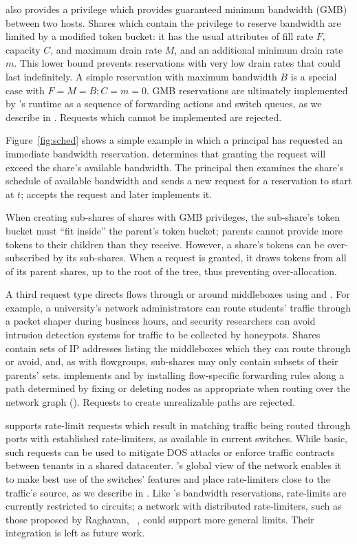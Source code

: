 \sys also provides a  privilege which provides
guaranteed minimum bandwidth (GMB) between two hosts.
Shares which contain the privilege to reserve bandwidth are limited
by a modified token bucket:
it has the usual attributes of fill rate $F$, capacity $C$, and maximum
drain rate $M$, and an additional minimum drain rate $m$. This lower
bound prevents reservations with very low drain rates that could
last indefinitely. A simple reservation with maximum
bandwidth $B$ is a special case with $F = M = B; C = m = 0$. GMB
reservations are ultimately implemented by \sys's runtime as a
sequence of forwarding actions and switch queues, as we describe in
. Requests which cannot be implemented are
rejected.

Figure~\ref{fig:sched} shows a simple example in which a principal
has requested an immediate bandwidth reservation. \sys determines
that granting the request will exceed the share's available bandwidth.
The principal then examines the share's schedule of available bandwidth
and sends a new request for a reservation
to start at $t$; \sys accepts the request and later implements it.

When creating sub-shares of shares with GMB privileges, the sub-share's
token bucket must ``fit inside'' the parent's token bucket; parents cannot
provide more tokens to their children than they receive. However, a share's
tokens can be over-subscribed by its sub-shares. When a request is granted,
it draws tokens from all of its parent shares, up to the root of the tree, thus
preventing over-allocation.

A third request type directs flows through or around middleboxes using
 and .
For example, a university's network administrators can
route students' traffic through a packet shaper during business hours,
and security researchers can avoid intrusion detection systems for traffic to be collected by honeypots.
Shares contain sets of IP addresses listing the middleboxes which
they can route through or avoid, and, as with flowgroups, sub-shares may
only contain subsets of their parents' sets.
\sys implements  and  by installing flow-specific
forwarding rules along a path determined by
fixing or deleting nodes as appropriate when routing over the network graph
(). Requests to create unrealizable paths are rejected.

\sys supports rate-limit requests which result in matching traffic 
being routed through
ports with established rate-limiters, as available in current switches.
While basic, such requests can be used to mitigate DOS attacks or
enforce traffic contracts between tenants in a shared datacenter.
\sys's global view of the network enables it to make best use of the switches'
features and place rate-limiters close to the traffic's source, as we describe in .
Like \sys's bandwidth reservations, rate-limits are currently restricted to circuits;
a network with distributed rate-limiters, such as those proposed
by Raghavan, \etal~\cite{Raghavan:2007}, could support more general limits.
Their integration is left as future work.

